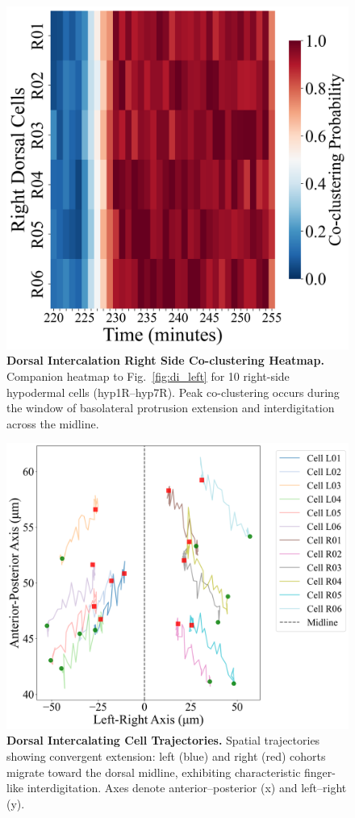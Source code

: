 \documentclass[unnumsec,webpdf,modern,large,namedate]{oup-authoring-template}%
\theoremstyle{thmstyleone}\newtheorem{theorem}{Theorem}
\theoremstyle{thmstyletwo}\newtheorem{example}{Example}
\theoremstyle{thmstylethree}\newtheorem{definition}{Definition}
\begin{document}
\begin{figure}[t]
  \centering
  \includegraphics[width=\linewidth]{Demo1B_Dorsal_Right_Coclustering_Heatmap.png}
  \caption{\textbf{Dorsal Intercalation Right Side Co-clustering Heatmap.} Companion heatmap to Fig.~\ref{fig:di_left} for 10 right-side hypodermal cells (hyp1R--hyp7R). Peak co-clustering occurs during the window of basolateral protrusion extension and interdigitation across the midline.}
  \label{fig:di_right}
\end{figure}

\begin{figure}[t]
  \centering
  \includegraphics[width=\linewidth]{Demo2_Dorsal_Cell_Trajectories.png}
  \caption{\textbf{Dorsal Intercalating Cell Trajectories.} Spatial trajectories showing convergent extension: left (blue) and right (red) cohorts migrate toward the dorsal midline, exhibiting characteristic finger-like interdigitation. Axes denote anterior--posterior (x) and left--right (y).}
  \label{fig:di_tracks}
\end{figure}
\end{document}
